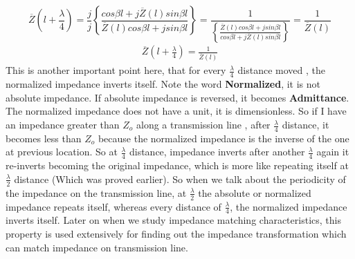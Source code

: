 \begin{dmath*}
\overline{Z}(l+\frac{\lambda}{4}) =\frac{j}{j} \left\lbrace \frac{cos\beta l + j\overline{Z}(l)sin\beta l}{\overline{Z}(l)cos\beta l + jsin\beta l}\right\rbrace = 
 \frac{1}{\left\lbrace \frac{\overline{Z}(l)cos\beta l + jsin\beta l}{cos\beta l + j\overline{Z}(l)sin\beta l}\right\rbrace} =\frac{1}{\overline{Z} (l)}
 \end{dmath*}
 \begin{align*}
 \overline{Z}(l+\frac{\lambda}{4}) = \frac{1}{\overline{Z} (l)}
 \end{align*}
 This is another important point here, that for every $\frac{\lambda}{4}$ distance moved , the normalized impedance inverts itself. Note the word \textbf{Normalized}, it is not absolute impedance. If absolute impedance is reversed, it becomes \textbf{Admittance}. The normalized impedance does not have a unit, it is dimensionless. So if I have an impedance greater than $Z_o$ along a transmission line , after $\frac{\lambda}{4}$ distance, it becomes less than $Z_o$ because the normalized impedance is the inverse of the one at previous location. So at $\frac{\lambda}{4}$ distance, impedance inverts after another $\frac{\lambda}{4}$ again it re-inverts becoming the original impedance, which is more like repeating itself at $\frac{\lambda}{2}$ distance (Which was proved earlier). So when we talk about the periodicity of the impedance on the transmission line, at $\frac{\lambda}{2}$ the absolute or normalized impedance repeats itself, whereas every distance of $\frac{\lambda}{4}$, the normalized impedance inverts itself. Later on when we study impedance matching characteristics, this property is used extensively for finding out the impedance transformation which can match impedance on transmission line.\\
 
